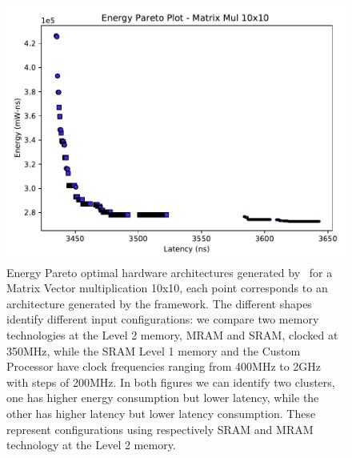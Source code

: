 \begin{figure}[tb] 
\centering
\includegraphics[width=\columnwidth]{graphs/EnergyParetoMatrixMul10.pdf}
    \caption{\small Energy Pareto optimal hardware architectures generated by \frameworkname~for a Matrix Vector multiplication 10x10, each point corresponds to an architecture generated by the framework. The different shapes identify different input configurations: we compare two memory technologies at the Level 2 memory, MRAM and SRAM, clocked at 350MHz, while the SRAM Level 1 memory and the Custom Processor have clock frequencies ranging from 400MHz to 2GHz with steps of 200MHz. In both figures we can identify two clusters, one has higher energy consumption but lower latency, while the other has higher latency but lower latency consumption. These represent  configurations using respectively SRAM and MRAM technology at the Level 2 memory.}
\label{fig:sram_vs_mram_pareto_mul}
\end{figure}
